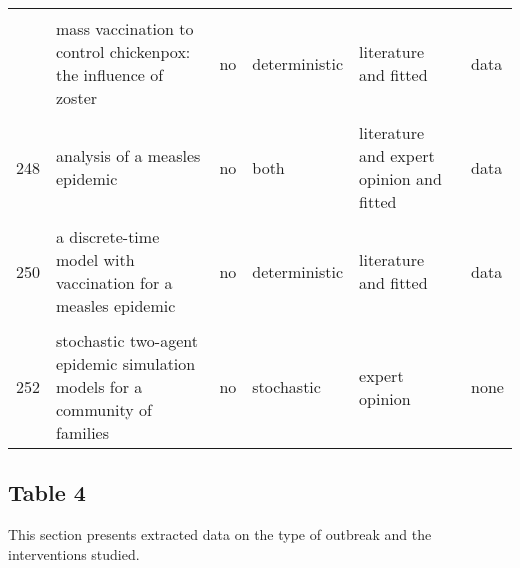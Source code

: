 \documentclass[
]{article}
\begin{document}
\begin{landscape}
\begin{longtable}{l>{\raggedright\arraybackslash}p{3cm}l>{\raggedright\arraybackslash}p{3cm}ll}
\cellcolor{gray!6}{245} & \cellcolor{gray!6}{modelling vaccination strategy against directly transmitted diseases using a series of pulses} & \cellcolor{gray!6}{no} & \cellcolor{gray!6}{deterministic} & \cellcolor{gray!6}{literature and expert opinion} & \cellcolor{gray!6}{none}\\
\addlinespace
246 & mass vaccination to control chickenpox: the influence of zoster & no & deterministic & literature and fitted & data\\
\cellcolor{gray!6}{247} & \cellcolor{gray!6}{an evaluation of alternate control strategies for foot-and-mouth disease in australia: a regional approach} & \cellcolor{gray!6}{no} & \cellcolor{gray!6}{stochastic} & \cellcolor{gray!6}{literature} & \cellcolor{gray!6}{none}\\
248 & analysis of a measles epidemic & no & both & literature and expert opinion and fitted & data\\
\cellcolor{gray!6}{249} & \cellcolor{gray!6}{a model of the transmission of dengue fever with an evaluation of the impact of ultra-low volume (ulv) insecticide applications on dengue epidemics} & \cellcolor{gray!6}{no} & \cellcolor{gray!6}{deterministic} & \cellcolor{gray!6}{literature and expert opinion} & \cellcolor{gray!6}{none}\\
250 & a discrete-time model with vaccination for a measles epidemic & no & deterministic & literature and fitted & data\\
\addlinespace
\cellcolor{gray!6}{251} & \cellcolor{gray!6}{a stochastic model of epidemics in military recruits} & \cellcolor{gray!6}{no} & \cellcolor{gray!6}{stochastic} & \cellcolor{gray!6}{expert opinion} & \cellcolor{gray!6}{none}\\
252 & stochastic two-agent epidemic simulation models for a community of families & no & stochastic & expert opinion & none\\*
\end{longtable}
\endgroup{}
\end{landscape}

\hypertarget{table-4}{%
\subsection{Table 4}\label{table-4}}

This section presents extracted data on the type of outbreak and the
interventions studied.
\end{document}
